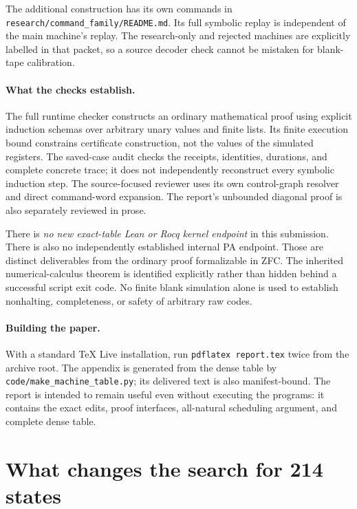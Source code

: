 \documentclass[11pt,letterpaper]{article}
\theoremstyle{definition}
\newcommand{\pathfile}[1]{\texttt{\nolinkurl{#1}}}
\begin{document}
The additional construction has its own commands in
\pathfile{research/command_family/README.md}.  Its full symbolic replay
is independent of the main machine's replay.  The research-only and
rejected machines are explicitly labelled in that packet, so a source
decoder check cannot be mistaken for blank-tape calibration.

\paragraph{What the checks establish.}
The full runtime checker constructs an ordinary mathematical proof
using explicit induction schemas over arbitrary unary values and finite
lists.  Its finite execution bound constrains certificate construction,
not the values of the simulated registers.  The saved-case audit checks
the receipts, identities, durations, and complete concrete trace; it
does not independently reconstruct every symbolic induction step.
The source-focused reviewer uses its own control-graph resolver and
direct command-word expansion.  The report's unbounded diagonal proof
is also separately reviewed in prose.

There is \emph{no new exact-table Lean or Rocq kernel endpoint} in this
submission.  There is also no independently established internal PA
endpoint.  Those are distinct deliverables from the ordinary proof
formalizable in ZFC.  The inherited numerical-calculus theorem is
identified explicitly rather than hidden behind a successful script
exit code.  No finite blank simulation alone is used to establish
nonhalting, completeness, or safety of arbitrary raw codes.

\paragraph{Building the paper.}
With a standard TeX Live installation, run \pathfile{pdflatex report.tex}
twice from the archive root.  The appendix is generated from the dense
table by \pathfile{code/make_machine_table.py}; its delivered text is
also manifest-bound.  The report is intended to remain useful even
without executing the programs: it contains the exact edits, proof
interfaces, all-natural scheduling argument, and complete dense table.

\section{What changes the search for 214 states}
\label{sec:next}
\end{document}
